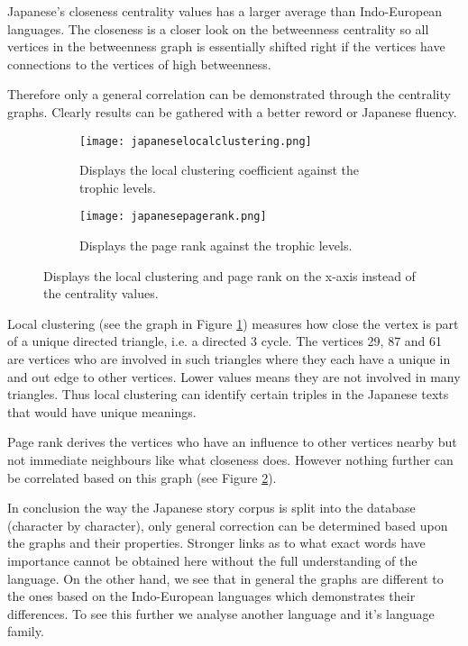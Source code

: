 Japanese's closeness centrality values has a larger average than Indo-European languages. The closeness is a closer look on the betweenness centrality so all vertices in the betweenness graph is essentially shifted right if the vertices have connections to the vertices of high betweenness.

Therefore only a general correlation can be demonstrated through the centrality graphs. Clearly results can be gathered with a better reword or Japanese fluency.

\begin{figure}[H]
\centering
\begin{subfigure}{.45\textwidth}
	\hspace{-1cm} 
	\texttt{[image: japaneselocalclustering.png]}
	\caption{Displays the local clustering coefficient against the trophic levels.}
	\label{fig:jplc}
\end{subfigure}
\hfill
\begin{subfigure}{.45\textwidth}
	\hspace{-1cm} 
	\texttt{[image: japanesepagerank.png]}
	\caption{Displays the page rank against the trophic levels.}
	\label{fig:jppr}
\end{subfigure}
\caption{Displays the local clustering and page rank on the x-axis instead of the centrality values.}
\label{fig:jpother}
\end{figure}

Local clustering (see the graph in Figure \ref{fig:jplc}) measures how close the vertex is part of a unique directed triangle, i.e. a directed 3 cycle. The vertices 29, 87 and 61 are vertices who are involved in such triangles where they each have a unique in and out edge to other vertices. Lower values means they are not involved in many triangles. Thus local clustering can identify certain triples in the Japanese texts that would have unique meanings. 

Page rank derives the vertices who have an influence to other vertices nearby but not immediate neighbours like what closeness does. However nothing further can be correlated based on this graph (see Figure \ref{fig:jppr}).

In conclusion the way the Japanese story corpus is split into the database (character by character), only general correction can be determined based upon the graphs and their properties. Stronger links as to what exact words have importance cannot be obtained here without the full understanding of the language. On the other hand, we see that in general the graphs are different to the ones based on the Indo-European languages which demonstrates their differences. To see this further we analyse another language and it's language family.

